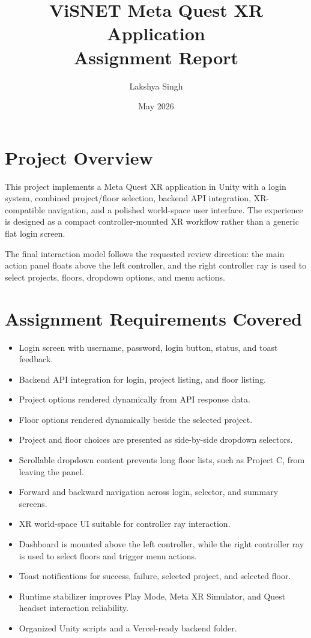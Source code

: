 \documentclass[11pt,a4paper]{article}
\title{\textbf{ViSNET Meta Quest XR Application}\\Assignment Report}
\author{Lakshya Singh}
\date{May 2026}
\begin{document}
\maketitle

\section{Project Overview}
This project implements a Meta Quest XR application in Unity with a login system, combined project/floor selection, backend API integration, XR-compatible navigation, and a polished world-space user interface. The experience is designed as a compact controller-mounted XR workflow rather than a generic flat login screen.

The final interaction model follows the requested review direction: the main action panel floats above the left controller, and the right controller ray is used to select projects, floors, dropdown options, and menu actions.

\section{Assignment Requirements Covered}
\begin{itemize}
    \item Login screen with username, password, login button, status, and toast feedback.
    \item Backend API integration for login, project listing, and floor listing.
    \item Project options rendered dynamically from API response data.
    \item Floor options rendered dynamically beside the selected project.
    \item Project and floor choices are presented as side-by-side dropdown selectors.
    \item Scrollable dropdown content prevents long floor lists, such as Project C, from leaving the panel.
    \item Forward and backward navigation across login, selector, and summary screens.
    \item XR world-space UI suitable for controller ray interaction.
    \item Dashboard is mounted above the left controller, while the right controller ray is used to select floors and trigger menu actions.
    \item Toast notifications for success, failure, selected project, and selected floor.
    \item Runtime stabilizer improves Play Mode, Meta XR Simulator, and Quest headset interaction reliability.
    \item Organized Unity scripts and a Vercel-ready backend folder.
\end{itemize}
\end{document}
